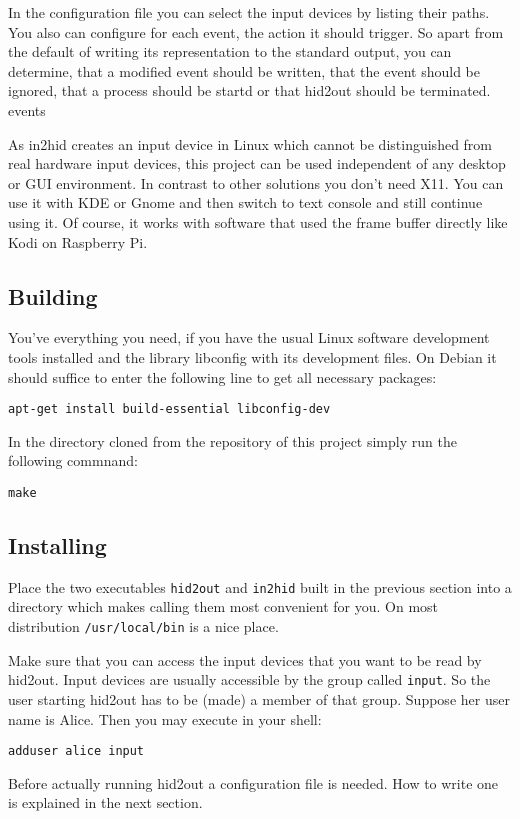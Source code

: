 In the configuration file you can select the input devices by
listing their paths.
You also can configure for each event, the action it should trigger.
So apart from the default of writing its representation to the 
standard output, you can determine, that a modified event should be written,
that the event should be ignored, that a process should be startd
or that hid2out should be terminated.
events

As in2hid creates an input device in Linux which cannot be distinguished
from real hardware input devices, this project can be used independent
of any desktop or GUI environment. In contrast to other solutions
you don't need X11. You can use it with KDE or Gnome and then switch to 
text console and still continue using it. Of course, it works with 
software that used the frame buffer directly like Kodi on Raspberry Pi.

\subsection{Building}
You've everything you need,
if you have the usual Linux software development tools installed
and the library libconfig with its development files.
On Debian it should suffice to enter the following line to
get all necessary packages:
\begin{verbatim}
apt-get install build-essential libconfig-dev
\end{verbatim}

In the directory cloned from the repository of
this project simply run the following commnand:
\begin{verbatim}
make
\end{verbatim}

\subsection{Installing}
Place the two executables 
\texttt{hid2out} and \texttt{in2hid}
built in the previous section
into a directory which makes calling
them most convenient for you. 
On most distribution \verb|/usr/local/bin| is a nice place.

Make sure that you can access the input devices that you want to 
be read by hid2out. Input devices are usually accessible by the 
group called \verb|input|. So the user starting hid2out 
has to be (made) a member of that group. Suppose her user name 
is Alice. Then you may execute  in your shell:
\begin{verbatim}
adduser alice input
\end{verbatim}
Before actually running hid2out a configuration file is needed.
How to write one is explained in the next section.

